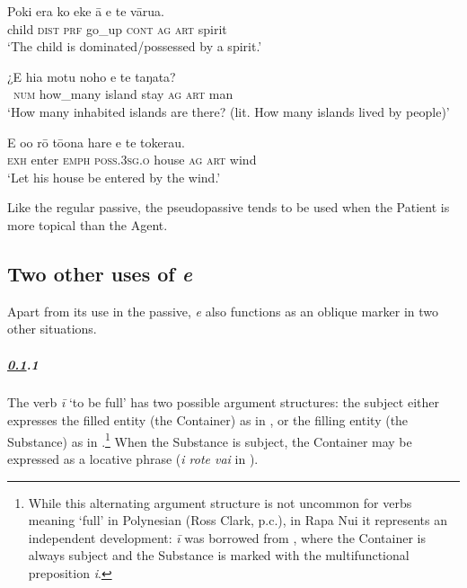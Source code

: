 \ea\label{ex:8.60}
\gll Poki era ko eke {\ꞌ}ā e te vārua.\\
child \textsc{dist} \textsc{prf} go\_up \textsc{cont} \textsc{ag} \textsc{art} spirit\\

\glt 
‘The child is dominated/possessed by a spirit.’ \textstyleExampleref{[R310.268]} 
\z

\ea\label{ex:8.61}
\gll ¿E hia motu noho e te taŋata?\\
~\textsc{num} how\_many island stay \textsc{ag} \textsc{art} man\\

\glt 
‘How many inhabited islands are there? (lit. How many islands lived by people)’ \textstyleExampleref{[R616.132]} 
\z

\ea\label{ex:8.62}
\gll E o{\ꞌ}o rō tō{\ꞌ}ona hare e te tokerau.  \\
\textsc{exh} enter \textsc{emph} \textsc{poss.3sg.o} house \textsc{ag} \textsc{art} wind  \\

\glt
‘Let his house be entered by the wind.’ \textstyleExampleref{[Acts 1:20]}
\z

Like the regular passive, the pseudopassive tends to be used when the Patient is more topical than the Agent.

\subsection{Two other uses of \textit{e}}\label{sec:8.5.3}

Apart from its use in the passive, \textit{e} also functions as an oblique marker in two other situations. 

\subparagraph{\ref{sec:8.5.3}.1} The verb \textit{{\ꞌ}ī} ‘to be full’ has two possible argument structures: the subject either expresses the filled entity (the Container) as in , or the filling entity (the Substance) as in .\footnote{\label{fn:417}While this alternating argument structure is not uncommon for verbs meaning ‘full’ in Polynesian (Ross Clark, p.c.), in Rapa Nui it represents an independent development: \textit{{\ꞌ}ī} was borrowed from , where the Container is always subject and the Substance is marked with the multifunctional preposition \textit{i}.} When the Substance is subject, the Container may be expressed as a locative phrase (\textit{{\ꞌ}i rote vai} in ).

